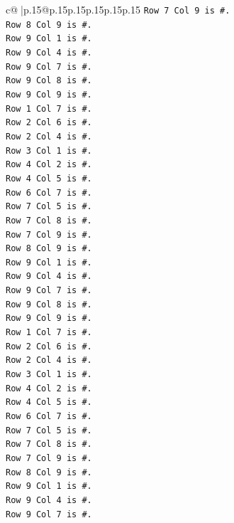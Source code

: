 \documentclass{article}
\begin{document}
{\begin{supertabular}{c@{$\;$}|p{.15\linewidth}@{}p{.15\linewidth}p{.15\linewidth}p{.15\linewidth}p{.15\linewidth}p{.15\linewidth}}
{{{\texttt{Row 7 Col 9 is \#.} \\
\texttt{Row 8 Col 9 is \#.} \\
\texttt{Row 9 Col 1 is \#.} \\
\texttt{Row 9 Col 4 is \#.} \\
\texttt{Row 9 Col 7 is \#.} \\
\texttt{Row 9 Col 8 is \#.} \\
\texttt{Row 9 Col 9 is \#.} \\
\texttt{Row 1 Col 7 is \#.} \\
\texttt{Row 2 Col 6 is \#.} \\
\texttt{Row 2 Col 4 is \#.} \\
\texttt{Row 3 Col 1 is \#.} \\
\texttt{Row 4 Col 2 is \#.} \\
\texttt{Row 4 Col 5 is \#.} \\
\texttt{Row 6 Col 7 is \#.} \\
\texttt{Row 7 Col 5 is \#.} \\
\texttt{Row 7 Col 8 is \#.} \\
\texttt{Row 7 Col 9 is \#.} \\
\texttt{Row 8 Col 9 is \#.} \\
\texttt{Row 9 Col 1 is \#.} \\
\texttt{Row 9 Col 4 is \#.} \\
\texttt{Row 9 Col 7 is \#.} \\
\texttt{Row 9 Col 8 is \#.} \\
\texttt{Row 9 Col 9 is \#.} \\
\texttt{Row 1 Col 7 is \#.} \\
\texttt{Row 2 Col 6 is \#.} \\
\texttt{Row 2 Col 4 is \#.} \\
\texttt{Row 3 Col 1 is \#.} \\
\texttt{Row 4 Col 2 is \#.} \\
\texttt{Row 4 Col 5 is \#.} \\
\texttt{Row 6 Col 7 is \#.} \\
\texttt{Row 7 Col 5 is \#.} \\
\texttt{Row 7 Col 8 is \#.} \\
\texttt{Row 7 Col 9 is \#.} \\
\texttt{Row 8 Col 9 is \#.} \\
\texttt{Row 9 Col 1 is \#.} \\
\texttt{Row 9 Col 4 is \#.} \\
\texttt{Row 9 Col 7 is \#.} \\
}}}
\end{supertabular}}
\end{document}
